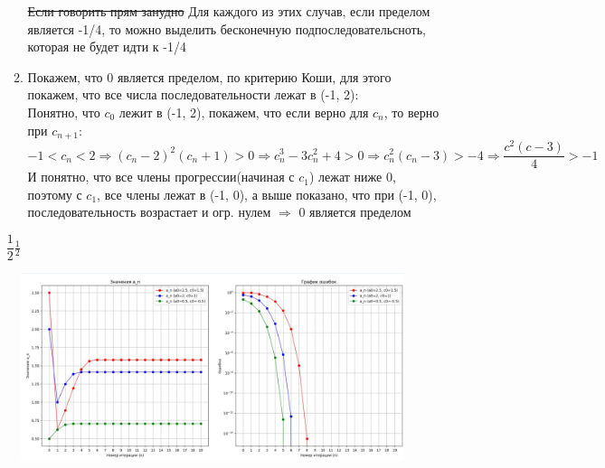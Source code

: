 \documentclass{report}
\begin{document}
\begin{enumerate}
\begin{enumerate}
        \sout{Если говорить прям занудно} Для каждого из этих случав, если пределом является -1/4, то можно выделить бесконечную подпоследовательсноть, которая не будет идти к -1/4
    \item 
        Покажем, что 0 является пределом, по критерию Коши, для этого покажем, что все числа последовательности лежат в (-1, 2):\\
        Понятно, что $c_0$ лежит в (-1, 2), покажем, что если верно для $c_n$, то верно при $c_{n+1}$:
        \begin{equation*}
            -1<c_n<2 \Rightarrow (c_n-2)^2(c_n+1)>0 \Rightarrow c_n^3-3c_n^2+4>0 \Rightarrow c_n^2(c_n-3)>-4 \Rightarrow \dfrac{c^2(c-3)}{4}>-1
        \end{equation*}
        И понятно, что все члены прогрессии(начиная с $c_1$) лежат ниже 0, поэтому с $c_1$, все члены лежат в (-1, 0), а выше показано, что при (-1, 0), последовательность возрастает и огр. нулем $\Rightarrow$ 0 является пределом
        \end{enumerate}
        $\dfrac{1}{2} \frac{1}{2}$
\end{enumerate}
\begin{figure}[H]
\begin{center}

\includegraphics[scale=0.5]{21.png}
\end{center}
\end{figure}
\end{document}
